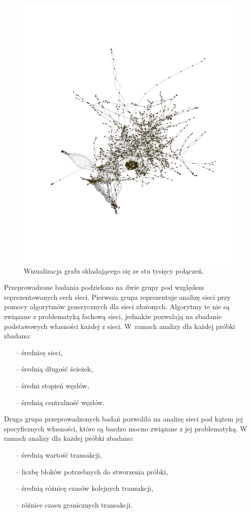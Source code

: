 \documentclass[12pt, twoside, final, openany]{mgr}
\begin{document}
\begin{figure}[H]
\begin{center}
\centering
\includegraphics[width=1\linewidth]{pictures/graph/graph.png}
\caption{Wizualizacja grafu składającego się ze stu tysięcy połączeń.}
\label{fig:graf}
\end{center}
\end{figure}

\newpage
\indent Przeprowadzone badania podzielono na dwie grupy pod względem reprezentowanych cech sieci. Pierwsza grupa reprezentuje analizę sieci przy pomocy algorytmów generycznych dla sieci złożonych. Algorytmy te nie są związane z problematyką fachową sieci, jednakże pozwalają na zbadanie podstawowych własności każdej z sieci. W~ramach analizy dla każdej próbki zbadano:
\begin{itemize}
\item[--] średnicę sieci,
\item[--] średnią długość ścieżek,
\item[--] średni stopień węzłów,
\item[--] średnią centralność węzłów.
\end{itemize}
Druga grupa przeprowadzonych badań pozwoliła na analizę sieci pod kątem jej specyficznych własności, które są bardzo mocno związane z jej problematyką. W ramach analizy dla każdej próbki zbadano:
\begin{itemize}
\item[--] średnią wartość transakcji,
\item[--] liczbę bloków potrzebnych do stworzenia próbki,
\item[--] średnią różnicę czasów kolejnych transakcji,
\item[--] różnice czasu granicznych transakcji.
\end{itemize}
\end{document}
